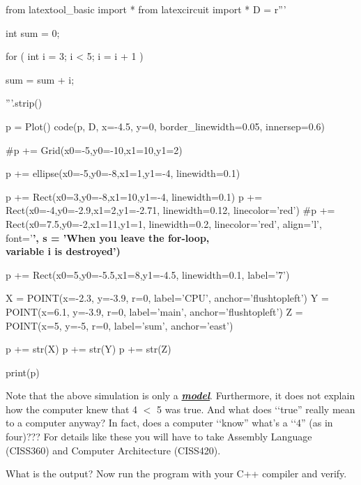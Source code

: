 \begin{python}
from latextool_basic import *
from latexcircuit import *
D = r'''



int sum = 0;

    for ( int i = 3;     i < 5;     i = i + 1 )


        sum = sum + i;



'''.strip()

p = Plot()
code(p, D, x=-4.5, y=0, border_linewidth=0.05, innersep=0.6)

#p += Grid(x0=-5,y0=-10,x1=10,y1=2)

p += ellipse(x0=-5,y0=-8,x1=1,y1=-4, linewidth=0.1)

p += Rect(x0=3,y0=-8,x1=10,y1=-4, linewidth=0.1)
p += Rect(x0=-4,y0=-2.9,x1=2,y1=-2.71, linewidth=0.12, linecolor='red')
#p += Rect(x0=7.5,y0=-2,x1=11,y1=1, linewidth=0.2, linecolor='red', align='l', font='\normalsize\bfseries', s = 'When you leave the for-loop, \\ variable i is destroyed')

p += Rect(x0=5,y0=-5.5,x1=8,y1=-4.5, linewidth=0.1, label='7')

X = POINT(x=-2.3, y=-3.9, r=0, label='CPU', anchor='flushtopleft')
Y = POINT(x=6.1, y=-3.9, r=0, label='main', anchor='flushtopleft')
Z = POINT(x=5, y=-5, r=0, label='sum', anchor='east')

p += str(X)
p += str(Y)
p += str(Z)

print(p)
\end{python}
\sidenote
{
}

Note that the above simulation is only a \emph{\textbf{\underline{model}}}.
Furthermore, it does not explain how the computer knew that 4 $<$ 5 was true. And what does \lq\lq true'' really mean to a computer anyway? In fact, does a computer \lq\lq know'' what's a \lq\lq 4''  (as in four)??? For details like these you will have to take Assembly Language (CISS360) and Computer Architecture (CISS420).



What is the output? Now run the program with your C++ compiler and
verify.

